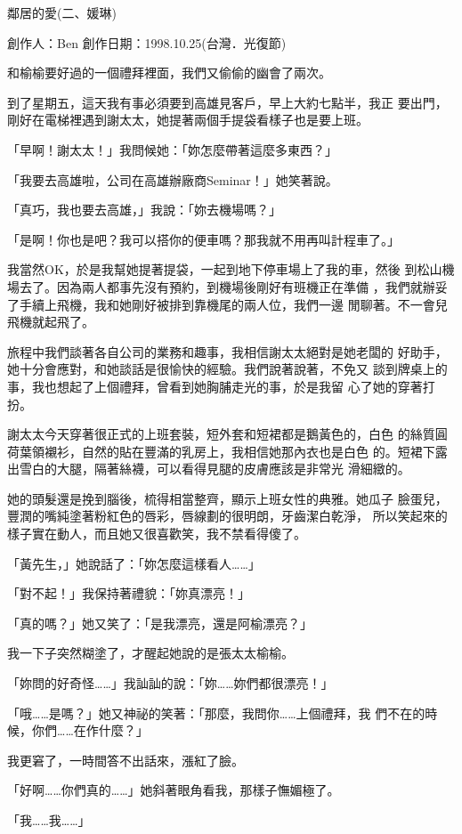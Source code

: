 鄰居的愛(二、媛琳)

創作人：Ben
創作日期：1998.10.25(台灣．光復節)


和榆榆要好過的一個禮拜裡面，我們又偷偷的幽會了兩次。

到了星期五，這天我有事必須要到高雄見客戶，早上大約七點半，我正
要出門，剛好在電梯裡遇到謝太太，她提著兩個手提袋看樣子也是要上班。

「早啊！謝太太！」我問候她：「妳怎麼帶著這麼多東西？」

「我要去高雄啦，公司在高雄辦廠商Seminar！」她笑著說。

「真巧，我也要去高雄，」我說：「妳去機場嗎？」

「是啊！你也是吧？我可以搭你的便車嗎？那我就不用再叫計程車了。」

我當然OK，於是我幫她提著提袋，一起到地下停車場上了我的車，然後
到松山機場去了。因為兩人都事先沒有預約，到機場後剛好有班機正在準備
，我們就辦妥了手續上飛機，我和她剛好被排到靠機尾的兩人位，我們一邊
閒聊著。不一會兒飛機就起飛了。

旅程中我們談著各自公司的業務和趣事，我相信謝太太絕對是她老闆的
好助手，她十分會應對，和她談話是很愉快的經驗。我們說著說著，不免又
談到牌桌上的事，我也想起了上個禮拜，曾看到她胸脯走光的事，於是我留
心了她的穿著打扮。

謝太太今天穿著很正式的上班套裝，短外套和短裙都是鵝黃色的，白色
的絲質圓荷葉領襯衫，自然的貼在豐滿的乳房上，我相信她那內衣也是白色
的。短裙下露出雪白的大腿，隔著絲襪，可以看得見腿的皮膚應該是非常光
滑細緻的。

她的頭髮還是挽到腦後，梳得相當整齊，顯示上班女性的典雅。她瓜子
臉蛋兒，豐潤的嘴純塗著粉紅色的唇彩，唇線劃的很明朗，牙齒潔白乾淨，
所以笑起來的樣子實在動人，而且她又很喜歡笑，我不禁看得傻了。

「黃先生，」她說話了：「妳怎麼這樣看人……」

「對不起！」我保持著禮貌：「妳真漂亮！」

「真的嗎？」她又笑了：「是我漂亮，還是阿榆漂亮？」

我一下子突然糊塗了，才醒起她說的是張太太榆榆。

「妳問的好奇怪……」我訕訕的說：「妳……妳們都很漂亮！」

「哦……是嗎？」她又神祕的笑著：「那麼，我問你……上個禮拜，我
們不在的時候，你們……在作什麼？」

我更窘了，一時間答不出話來，漲紅了臉。

「好啊……你們真的……」她斜著眼角看我，那樣子憮媚極了。

「我……我……」

